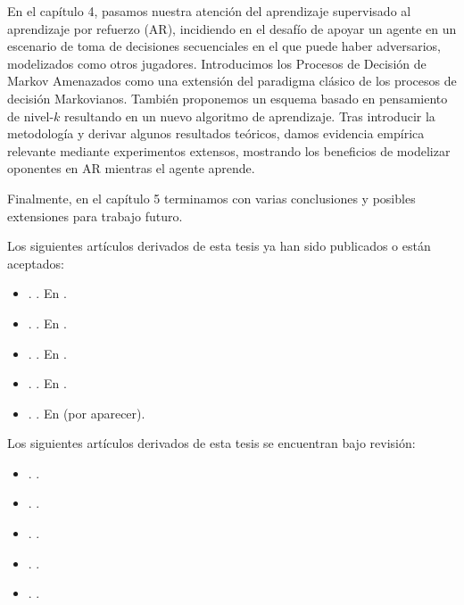 \documentclass[a4paper, 11pt, openright, twoside]{reportPhD}
\numberwithin{figure}{chapter}
\numberwithin{table}{chapter}
\numberwithin{equation}{chapter}
\begin{document}
En el capítulo 4, pasamos nuestra atención del aprendizaje supervisado al aprendizaje por refuerzo (AR), incidiendo en el desafío de apoyar un agente en un escenario de toma de decisiones secuenciales en el que puede haber adversarios, modelizados como otros jugadores. Introducimos los Procesos de Decisión de Markov Amenazados como una extensión del paradigma clásico de los procesos de decisión Markovianos. También proponemos un esquema basado en pensamiento de nivel-$k$ resultando en un nuevo algoritmo de aprendizaje. Tras introducir la metodología y derivar algunos resultados teóricos, damos evidencia empírica relevante mediante experimentos extensos, mostrando los beneficios de modelizar oponentes en AR mientras el agente aprende.

Finalmente, en el capítulo 5 terminamos con varias conclusiones y posibles extensiones para trabajo futuro.

Los siguientes artículos derivados de esta tesis ya han sido publicados o están aceptados:
\begin{itemize}
    \item \cite{gallego2019dlms}. . En .
    \item \cite{gallego2019reinforcement}. . En .
     \item \cite{gallego2019vis}. . En .   
     \item \cite{math8111957}. . En .
     \item \cite{nn2022}. . En  (por aparecer).
\end{itemize}

Los siguientes artículos derivados de esta tesis se encuentran bajo revisión:
\begin{itemize}
    \item \citeauthor{gallego2019opponent}. . 
        \item \citeauthor{gallego2021data}. . 
    \item \citeauthor{gallego2018stochastic}. . 
    \item \citeauthor{AMLARA}. .
     \item \citeauthor{gallego2020protecting}. . 
\end{itemize}
\end{document}
